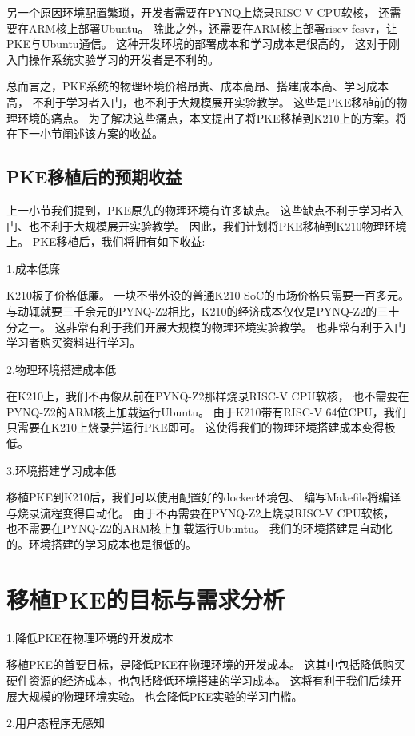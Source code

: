 另一个原因环境配置繁琐，开发者需要在PYNQ上烧录RISC-V CPU软核，
还需要在ARM核上部署Ubuntu。
除此之外，还需要在ARM核上部署riscv-fesvr，让PKE与Ubuntu通信。
这种开发环境的部署成本和学习成本是很高的，
这对于刚入门操作系统实验学习的开发者是不利的。

总而言之，PKE系统的物理环境价格昂贵、成本高昂、搭建成本高、学习成本高，
不利于学习者入门，也不利于大规模展开实验教学\cite{2021Reform}。
这些是PKE移植前的物理环境的痛点。
为了解决这些痛点，本文提出了将PKE移植到K210上的方案。将在下一小节阐述该方案的收益。

\subsection{PKE移植后的预期收益}

上一小节我们提到，PKE原先的物理环境有许多缺点。
这些缺点不利于学习者入门、也不利于大规模展开实验教学。
因此，我们计划将PKE移植到K210物理环境上。
PKE移植后，我们将拥有如下收益:

1.成本低廉
    
K210板子价格低廉。
一块不带外设的普通K210 SoC的市场价格只需要一百多元。
与动辄就要三千余元的PYNQ-Z2相比，K210的经济成本仅仅是PYNQ-Z2的三十分之一。
这非常有利于我们开展大规模的物理环境实验教学。
也非常有利于入门学习者购买资料进行学习。

2.物理环境搭建成本低
    
在K210上，我们不再像从前在PYNQ-Z2那样烧录RISC-V CPU软核，
也不需要在PYNQ-Z2的ARM核上加载运行Ubuntu。
由于K210带有RISC-V 64位CPU，我们只需要在K210上烧录并运行PKE即可。
这使得我们的物理环境搭建成本变得极低。

3.环境搭建学习成本低
    
移植PKE到K210后，我们可以使用配置好的docker环境包、
编写Makefile将编译与烧录流程变得自动化。
由于不再需要在PYNQ-Z2上烧录RISC-V CPU软核，
也不需要在PYNQ-Z2的ARM核上加载运行Ubuntu。
我们的环境搭建是自动化的。环境搭建的学习成本也是很低的。

\section{移植PKE的目标与需求分析}

1.降低PKE在物理环境的开发成本

移植PKE的首要目标，是降低PKE在物理环境的开发成本。
这其中包括降低购买硬件资源的经济成本，也包括降低环境搭建的学习成本。
这将有利于我们后续开展大规模的物理环境实验。
也会降低PKE实验的学习门槛。

2.用户态程序无感知
    
